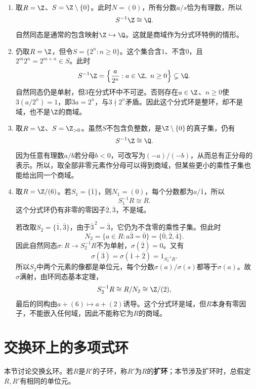 \begin{example}
\begin{enumerate}
\item 取$R=\Z$、$S=\Z\setminus\{0\}$。此时$N=(0)$，所有分数$a/s$恰为有理数，所以
\[
S^{-1}\Z\cong\Q.
\]
自然同态是通常的包含映射$\Z\hookrightarrow\Q$。这就是商域作为分式环特例的情形。

\item 仍取$R=\Z$，但令$S=\{2^n:n\ge0\}$。这个集合含$1$、不含$0$，且$2^m2^n=2^{m+n}\in S$。此时
\[
S^{-1}\Z=\left\{\frac{a}{2^n}:a\in\Z,\ n\ge0\right\}\subsetneq\Q.
\]
自然同态仍是单射，但$3$在分式环中不可逆。否则存在$a\in\Z$、$n\ge0$使$3(a/2^n)=1$，即$3a=2^n$，与$3\nmid2^n$矛盾。因此这个分式环是整环，却不是域，也不是$\Z$的商域。

\item 取$R=\Z$、$S=\Z_{>0}$。虽然$S$不包含负整数，是$\Z\setminus\{0\}$的真子集，仍有
\[
S^{-1}\Z\cong\Q.
\]
因为任意有理数$a/b$若分母$b<0$，可改写为$(-a)/(-b)$，从而总有正分母的表示。所以，取全部非零元素作分母可以得到商域，但某些更小的乘性子集也能给出同一个商域。

\item 取$R=\Z/(6)$。若$S_1=\{\overline1\}$，则$N_1=(0)$，每个分数都为$a/\overline1$，所以
\[
S_1^{-1}R\cong R.
\]
这个分式环仍有非零的零因子$\overline2,\overline3$，不是域。

若改取$S_2=\{\overline1,\overline3\}$，由于$\overline3^{\,2}=\overline3$，它仍为不含零的乘性子集。但此时
\[
N_2=\{a\in R:a\overline3=\overline0\}
=\{\overline0,\overline2,\overline4\}.
\]
因此自然同态$\sigma:R\to S_2^{-1}R$不为单射，$\sigma(\overline2)=0$。又有
\[
\sigma(\overline3)=\sigma(\overline1+\overline2)=1_{S_2^{-1}R}.
\]
所以$S_2$中两个元素的像都是单位元，每个分数$\sigma(a)/\sigma(s)$都等于$\sigma(a)$。故$\sigma$满射，由环同态基本定理，
\[
S_2^{-1}R\cong R/N_2\cong\Z/(2),
\]
最后的同构由$a+(6)\mapsto a+(2)$诱导。这个分式环是域，但$R$本身有零因子，不能嵌入任何域，因此不能称它为$R$的商域。
\end{enumerate}
\end{example}

\section{交换环上的多项式环}

\label{p2:concept:c3-extension-ring}本节讨论交换幺环。若$R$是$R'$的子环，称$R'$为$R$的\textbf{扩环}；本节涉及扩环时，总假定$R,R'$有相同的单位元。

